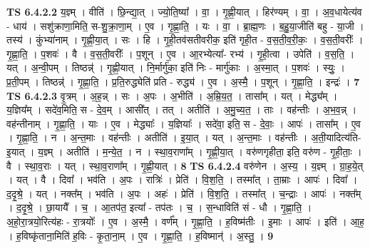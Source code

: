 \documentclass[17pt]{extarticle}
\begin{document}
                  \newline
                                \textbf{ TS 6.4.2.2} \newline
                  य॒ज्ञ्म् । वीति॑ । छि॒न्द्या॒त् । ज्यो॒ति॒ष्या᳚ । वा॒ । गृ॒ह्णी॒यात् । हिर॑ण्यम् । वा॒ । अ॒व॒धायेत्य॑व - धाय॑ । सशु॑क्राणा॒मिति॒ स-शु॒क्रा॒णा॒म् । ए॒व । गृ॒ह्णा॒ति॒ । यः । वा॒ । ब्रा॒ह्म॒णः । ब॒हु॒या॒जीति॑ बहु - या॒जी । तस्य॑ । कुंभ्या॑नाम् । गृ॒ह्णी॒या॒त् । सः । हि । गृ॒ही॒तव॑सतीवरीक॒ इति॑ गृही॒त - व॒स॒ती॒व॒री॒कः॒ । व॒स॒ती॒वरीः᳚ । गृ॒ह्णा॒ति॒ । प॒शवः॑ । वै । व॒स॒ती॒वरीः᳚ । प॒शून् । ए॒व । आ॒रभ्येत्या᳚- रभ्य॑ । गृ॒ही॒त्वा । उपेति॑ । व॒स॒ति॒ । यत् । अ॒न्वी॒पम् । तिष्ठन्न्॑ । गृ॒ह्णी॒यात् । नि॒र्मार्गु॑का॒ इति॑ निः - मार्गु॑काः । अ॒स्मा॒त् । प॒शवः॑ । स्युः॒ । प्र॒ती॒पम् । तिष्ठन्न्॑ । गृ॒ह्णा॒ति॒ । प्र॒ति॒रुद्ध्येति॑ प्रति - रुद्ध्य॑ । ए॒व । अ॒स्मै॒ । प॒शून् । गृ॒ह्णा॒ति॒ । इन्द्रः॑ । \textbf{  7} \newline
                  \newline
                                \textbf{ TS 6.4.2.3} \newline
                  वृ॒त्रम् । अ॒ह॒न्न् । सः । अ॒पः । अ॒भीति॑ । अ॒म्रि॒य॒त॒ । तासा᳚म् । यत् । मेद्ध्य᳚म् । य॒ज्ञिय᳚म् । सदे॑व॒मिति॒ स - दे॒व॒म् । आसी᳚त् । तत् । अतीति॑ । अ॒मु॒च्य॒त॒ । ताः । वह॑न्तीः । अ॒भ॒व॒न्न् । वह॑न्तीनाम् । गृ॒ह्णा॒ति॒ । याः । ए॒व । मेद्ध्याः᳚ । य॒ज्ञियाः᳚ । सदे॑वा॒ इति॒ स - दे॒वाः॒ । आपः॑ । तासा᳚म् । ए॒व । गृ॒ह्णा॒ति॒ । न । अ॒न्त॒माः । वह॑न्तीः । अतीति॑ । इ॒या॒त् । यत् । अ॒न्त॒माः । वह॑न्तीः । अ॒ती॒यादित्य॑ति-इ॒यात् । य॒ज्ञ्म् । अतीति॑ । म॒न्ये॒त॒ । न । स्था॒व॒राणा᳚म् । गृ॒ह्णी॒या॒त् । वरु॑णगृहीता॒ इति॒ वरु॑ण - गृ॒ही॒ताः॒ । वै । स्था॒व॒राः । यत् । स्था॒व॒राणा᳚म् । गृ॒ह्णी॒यात् । \textbf{  8} \newline
                  \newline
                                \textbf{ TS 6.4.2.4} \newline
                  वरु॑णेन । अ॒स्य॒ । य॒ज्ञ्म् । ग्रा॒ह॒ये॒त् । यत् । वै । दिवा᳚ । भव॑ति । अ॒पः । रात्रिः॑ । प्रेति॑ । वि॒श॒ति॒ । तस्मा᳚त् । ता॒म्राः । आपः॑ । दिवा᳚ । द॒दृ॒श्रे॒ । यत् । नक्त᳚म् । भव॑ति । अ॒पः । अहः॑ । प्रेति॑ । वि॒श॒ति॒ । तस्मा᳚त् । च॒न्द्राः । आपः॑ । नक्त᳚म् । द॒दृ॒श्रे॒ । छा॒यायै᳚ । च॒ । आ॒तप॑त॒ इत्या᳚ - तप॑तः । च॒ । स॒न्धाविति॑ सं - धौ । गृ॒ह्णा॒ति॒ । अ॒हो॒रा॒त्रयो॒रित्य॑हः - रा॒त्रयोः᳚ । ए॒व । अ॒स्मै॒ । वर्ण᳚म् । गृ॒ह्णा॒ति॒ । ह॒विष्म॑तीः । इ॒माः । आपः॑ । इति॑ । आ॒ह॒ । ह॒विष्कृ॑ताना॒मिति॑ ह॒विः - कृ॒ता॒ना॒म् । ए॒व । गृ॒ह्णा॒ति॒ । ह॒विष्मान्॑ । अ॒स्तु॒ । \textbf{  9} \newline
                  \newline
\end{document}
